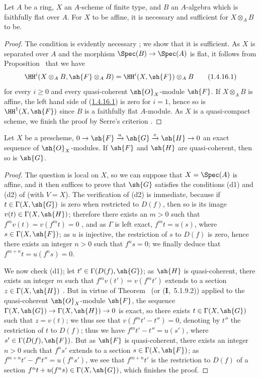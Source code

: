 \begin{corollary}[1.4.16]
\label{III.1.4.16}
Let $A$ be a ring, $X$ an $A$-scheme of finite type, and $B$ an $A$-algebra which is faithfully flat over $A$.
For $X$ to be affine, it is necessary and sufficient for $X\otimes_A B$ to be.
\end{corollary}

\begin{proof}
The condition is evidently necessary ; we show that it is sufficient.
As $X$ is separated over $A$ and the morphism $\Spec(B)\to\Spec(A)$ is flat, it follows from Proposition~ that we have
\[
\label{III.1.4.16.1}
  \HH^i(X\otimes_A B,\sh{F}\otimes_A B)=\HH^i(X,\sh{F})\otimes_A B
  \tag{1.4.16.1}
\]
for every $i\geq 0$ and every quasi-coherent $\sh{O}_X$-module $\sh{F}$.
If $X\otimes_A B$ is affine, the left hand side of (\hyperref[III.1.4.16.1]{1.4.16.1}) is zero for $i=1$, hence so is $\HH^1(X,\sh{F})$ since $B$ is a faithfully flat $A$-module.
As $X$ is a quasi-compact scheme, we finish the proof by Serre's criterion .
\end{proof}

\begin{proposition}[1.4.17]
\label{III.1.4.17}
Let $X$ be a prescheme, $0\to\sh{F}\xrightarrow{u}\sh{G}\xrightarrow{v}\sh{H}\to 0$ an exact sequence of $\sh{O}_X$-modules.
If $\sh{F}$ and $\sh{H}$ are quasi-coherent, then so is $\sh{G}$.
\end{proposition}

\begin{proof}
The question is local on $X$, so we can suppose that $X=\Spec(A)$ is affine, and it then suffices to prove that $\sh{G}$ satisfies the conditions (d1) and (d2) of  (with $V=X$).
The verification of (d2) is immediate, because if $t\in\Gamma(X,\sh{G})$ is zero when restricted to $D(f)$, then so is its image $v(t)\in\Gamma(X,\sh{H})$; therefore there exists an $m>0$ such that $f^m v(t)=v(f^m t)=0$ , and as $\Gamma$ is left exact, $f^m t=u(s)$, where $s\in\Gamma(X,\sh{F})$; as $u$ is injective, the restriction of $s$ to $D(f)$ is zero, hence  there exists an integer $n>0$ such that $f^n s=0$; we finally deduce that $f^{m+n}t=u(f^n s)=0$.

We now check (d1); let $t'\in\Gamma(D(f),\sh{G})$; as $\sh{H}$ is quasi-coherent, there exists an integer $m$ such that $f^m v(t')=v(f^m t')$ extends to a section $z\in\Gamma(X,\sh{H})$ .
But in virtue of Theorem~ (or (\textbf{I},~5.1.9.2)) applied to the quasi-coherent $\sh{O}_X$-module $\sh{F}$, the sequence $\Gamma(X,\sh{G})\to\Gamma(X,\sh{H})\to 0$ is exact, so there exists $t\in\Gamma(X,\sh{G})$ such that $z=v(t)$; we thus see that $v(f^m t'-t'')=0$, denoting by $t''$ the restriction of $t$ to $D(f)$; thus we have $f^m t'-t''=u(s')$, where $s'\in\Gamma(D(f),\sh{F})$.
But as $\sh{F}$ is quasi-coherent, there exists an integer $n>0$ such that $f^n s'$ extends to a section $s\in\Gamma(X,\sh{F})$; as $f^{m+n}t'-f^n t''=u(f^n s')$, we see that $f^{m+n}t'$ is the restriction to $D(f)$ of a section $f^n t+u(f^n s)\in\Gamma(X,\sh{G})$, which finishes the proof.
\end{proof}
